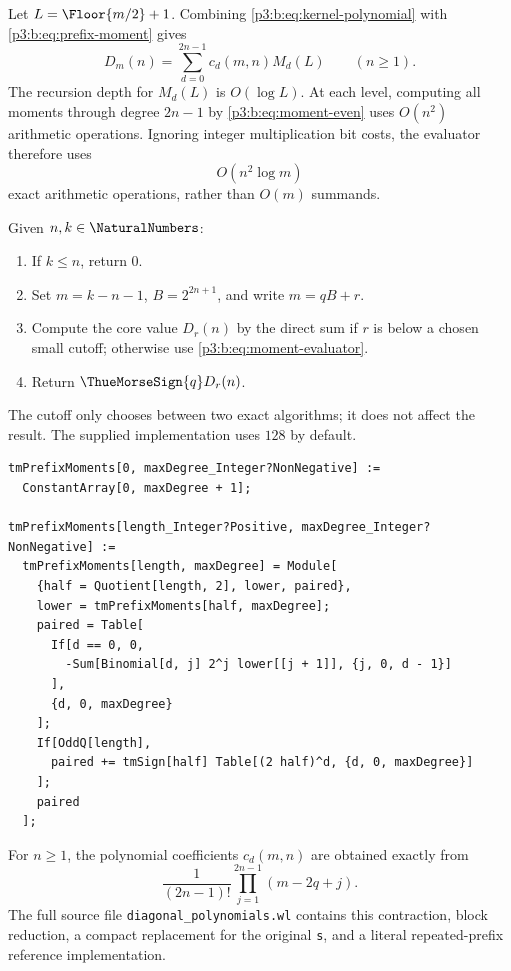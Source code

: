 \documentclass[11pt,oneside]{article}
\numberwithin{equation}{section}
\theoremstyle{definition}
\theoremstyle{remark}
\begin{document}
Let $L=\Floor{m/2}+1$.  Combining
\eqref{p3:b:eq:kernel-polynomial} with \eqref{p3:b:eq:prefix-moment} gives
\begin{equation}
 \boxed{\quad
 D_m(n)=\sum_{d=0}^{2n-1}c_d(m,n)M_d(L)
 \qquad(n\ge1).
 \quad}
 \label{p3:b:eq:moment-evaluator}
\end{equation}
The recursion depth for $M_d(L)$ is $O(\log L)$.  At each level, computing
all moments through degree $2n-1$ by \eqref{p3:b:eq:moment-even} uses
$O(n^2)$ arithmetic operations.  Ignoring integer multiplication bit costs,
the evaluator therefore uses
\begin{equation}
 O(n^2\log m)
 \label{p3:b:eq:moment-complexity}
\end{equation}
exact arithmetic operations, rather than $O(m)$ summands.

\begin{algorithm}
\label{p3:b:alg:hybrid}
Given $n,k\in\NaturalNumbers$:
\begin{enumerate}
 \item If $k\le n$, return $0$.
 \item Set $m=k-n-1$, $B=2^{2n+1}$, and write $m=qB+r$.
 \item Compute the core value $D_r(n)$ by the direct sum if $r$ is below
       a chosen small cutoff; otherwise use \eqref{p3:b:eq:moment-evaluator}.
 \item Return $\ThueMorseSign{q} D_r(n)$.
\end{enumerate}
\end{algorithm}

The cutoff only chooses between two exact algorithms; it does not affect the
result.  The supplied implementation uses $128$ by default.

\begin{lstlisting}[style=code,language=Wolfram]
tmPrefixMoments[0, maxDegree_Integer?NonNegative] :=
  ConstantArray[0, maxDegree + 1];

tmPrefixMoments[length_Integer?Positive, maxDegree_Integer?NonNegative] :=
  tmPrefixMoments[length, maxDegree] = Module[
    {half = Quotient[length, 2], lower, paired},
    lower = tmPrefixMoments[half, maxDegree];
    paired = Table[
      If[d == 0, 0,
        -Sum[Binomial[d, j] 2^j lower[[j + 1]], {j, 0, d - 1}]
      ],
      {d, 0, maxDegree}
    ];
    If[OddQ[length],
      paired += tmSign[half] Table[(2 half)^d, {d, 0, maxDegree}]
    ];
    paired
  ];
\end{lstlisting}

For $n\ge1$, the polynomial coefficients $c_d(m,n)$ are obtained exactly
from
\[
 \frac{1}{(2n-1)!}\prod_{j=1}^{2n-1}(m-2q+j).
\]
The full source file \texttt{diagonal\_polynomials.wl} contains this
contraction, block reduction, a compact replacement for the original
\texttt{s}, and a literal repeated-prefix reference implementation.
\end{document}
